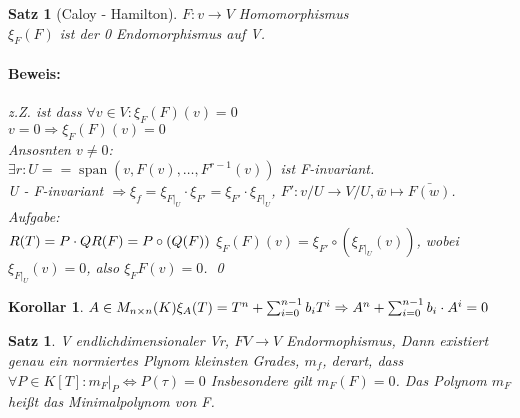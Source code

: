 \documentclass{report}
\DeclareMathOperator{\Span}{span}
\theoremstyle{customrem}
\theoremstyle{customdef}
\newtheorem{korrolar}[definition]{Korollar}
\newtheorem{satz}[definition]{Satz}
\renewenvironment{proof}{\paragraph{Beweis: }}{\qed}
\theoremstyle{customenv}
\begin{document}
\begin{satz}[Caloy - Hamilton]
  \(F : v \to V\) Homomorphismus\\
  \(\xi_F(F)\) ist der 0 Endomorphismus auf V.
  \begin{proof}
    z.Z. ist dass \(\forall v \in V : \xi_F(F)(v) = 0\)\\
    \(v = 0 \Rightarrow \xi_F(F)(v) = 0\)\\
    Ansosnten \(v \neq 0\):\\
    \(\exists r : U =  = \Span(v, F(v), \dots, F^{r-1}(v))\) ist F-invariant.\\
    U - F-invariant \(\Rightarrow \xi_f = \xi_{F|_U} \cdot \xi_{F'} = \xi_{F'} \cdot \xi_{F|_U}\), \(F' : v/U \to V/U, \bar{w} \mapsto \bar{F(w)}\).\\
    Aufgabe:\\
    \(R(T) = P \cdot Q\\ %
    R(F) = P \circ (Q(F))\) %
    \(\xi_F(F)(v) = \xi_{F'} \circ (\xi_{F|_U}(v))\), wobei \(\xi_{F|_U}(v) = 0\), also \(\xi_F{F}(v) = 0\).
  \end{proof}
\end{satz}

\begin{korrolar}
  \(A \in M_{n \times n}(K)\\
  \xi_A(T) = T^n + \sum_{i=0}^{n-1}b_i T^i \Rightarrow A^n + \sum_{i=0}^{n-1} b_i \cdot A^i = 0\)
\end{korrolar}

\begin{satz}
  V endlichdimensionaler Vr, \(F V \to V\) Endormophismus, Dann existiert genau ein normiertes
  Plynom kleinsten Grades,  \(m_f\), derart, dass \(\forall P \in K[T] : m_F |_P \Leftrightarrow P(\tau) = 0\)
  Insbesondere gilt \(m_F(F) = 0\). Das  Polynom \(m_F\) hei\ss{}t das Minimalpolynom von F. 
\end{satz}

\end{document}
